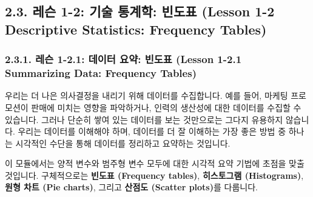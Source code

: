 \documentclass[11pt,a4paper]{article}
\begin{document}
\newpage
\subsection{2.3. 레슨 1-2: 기술 통계학: 빈도표 (Lesson 1-2 Descriptive Statistics: Frequency Tables)}

\subsubsection{2.3.1. 레슨 1-2.1: 데이터 요약: 빈도표 (Lesson 1-2.1 Summarizing Data: Frequency Tables)}

\begin{tcolorbox}[title={데이터 요약 (Summarizing Data)}]
우리는 더 나은 의사결정을 내리기 위해 데이터를 수집합니다. 예를 들어, 마케팅 프로모션이 판매에 미치는 영향을 파악하거나, 인력의 생산성에 대한 데이터를 수집할 수 있습니다. 그러나 단순히 쌓여 있는 데이터를 보는 것만으로는 그다지 유용하지 않습니다. 우리는 데이터를 이해해야 하며, 데이터를 더 잘 이해하는 가장 좋은 방법 중 하나는 시각적인 수단을 통해 데이터를 정리하고 요약하는 것입니다.

이 모듈에서는 양적 변수와 범주형 변수 모두에 대한 시각적 요약 기법에 초점을 맞출 것입니다. 구체적으로는 \textbf{빈도표 (Frequency tables)}, \textbf{히스토그램 (Histograms)}, \textbf{원형 차트 (Pie charts)}, 그리고 \textbf{산점도 (Scatter plots)}를 다룹니다.
\end{tcolorbox}
\end{document}
